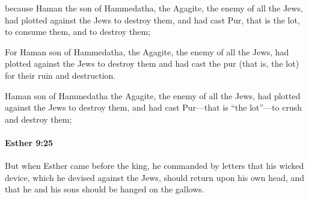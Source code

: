 			\begin{versebox}
					\item[BHS] 
					\item[LXX] 
					\item[ASV] because Haman the son of Hammedatha, the Agagite, the enemy of all the Jews, had plotted against the Jews to destroy them, and had cast Pur, that is the lot, to consume them, and to destroy them;
					\item[NIV] For Haman son of Hammedatha, the Agagite, the enemy of all the Jews, had plotted against the Jews to destroy them and had cast the pur (that is, the lot) for their ruin and destruction.
					\item[NRSV] Haman son of Hammedatha the Agagite, the enemy of all the Jews, had plotted against the Jews to destroy them, and had cast Pur—that is “the lot”—to crush and destroy them;
			\end{versebox}

		\paragraph{Esther 9:25} %
			\label{ESTHER-9-25}

			But when Esther came before the king, he commanded by letters that his wicked device, which he devised against the Jews, should return upon his own head, and that he and his sons should be hanged on the gallows.


